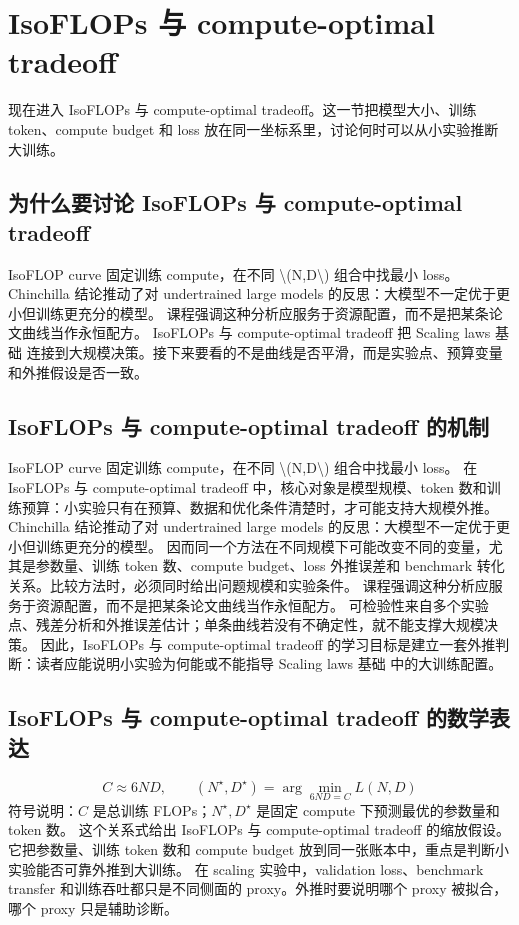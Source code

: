 \documentclass[a4paper]{article}
\begin{document}
\section{IsoFLOPs 与 compute-optimal tradeoff}
现在进入 IsoFLOPs 与 compute-optimal tradeoff。这一节把模型大小、训练 token、compute budget 和 loss 放在同一坐标系里，讨论何时可以从小实验推断大训练。
\subsection{为什么要讨论 IsoFLOPs 与 compute-optimal tradeoff}
IsoFLOP curve 固定训练 compute，在不同 \textbackslash{}(N,D\textbackslash{}) 组合中找最小 loss。
Chinchilla 结论推动了对 undertrained large models 的反思：大模型不一定优于更小但训练更充分的模型。
课程强调这种分析应服务于资源配置，而不是把某条论文曲线当作永恒配方。
IsoFLOPs 与 compute-optimal tradeoff 把 Scaling laws 基础 连接到大规模决策。接下来要看的不是曲线是否平滑，而是实验点、预算变量和外推假设是否一致。
\subsection{IsoFLOPs 与 compute-optimal tradeoff 的机制}
IsoFLOP curve 固定训练 compute，在不同 \textbackslash{}(N,D\textbackslash{}) 组合中找最小 loss。 在 IsoFLOPs 与 compute-optimal tradeoff 中，核心对象是模型规模、token 数和训练预算：小实验只有在预算、数据和优化条件清楚时，才可能支持大规模外推。
Chinchilla 结论推动了对 undertrained large models 的反思：大模型不一定优于更小但训练更充分的模型。 因而同一个方法在不同规模下可能改变不同的变量，尤其是参数量、训练 token 数、compute budget、loss 外推误差和 benchmark 转化关系。比较方法时，必须同时给出问题规模和实验条件。
课程强调这种分析应服务于资源配置，而不是把某条论文曲线当作永恒配方。 可检验性来自多个实验点、残差分析和外推误差估计；单条曲线若没有不确定性，就不能支撑大规模决策。
因此，IsoFLOPs 与 compute-optimal tradeoff 的学习目标是建立一套外推判断：读者应能说明小实验为何能或不能指导 Scaling laws 基础 中的大训练配置。
\subsection{IsoFLOPs 与 compute-optimal tradeoff 的数学表达}
\[C\approx 6ND,\qquad (N^\star,D^\star)=\arg\min_{6ND=C}L(N,D)\]
符号说明：\(C\) 是总训练 FLOPs；\(N^\star,D^\star\) 是固定 compute 下预测最优的参数量和 token 数。
这个关系式给出 IsoFLOPs 与 compute-optimal tradeoff 的缩放假设。它把参数量、训练 token 数和 compute budget 放到同一张账本中，重点是判断小实验能否可靠外推到大训练。
在 scaling 实验中，validation loss、benchmark transfer 和训练吞吐都只是不同侧面的 proxy。外推时要说明哪个 proxy 被拟合，哪个 proxy 只是辅助诊断。
\end{document}
